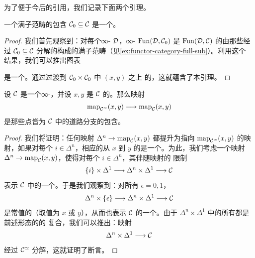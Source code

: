为了便于今后的引用，我们记录下面两个引理。

\begin{lemma}\label{lem:full-subcategory-fully-faithful}
一个满子范畴的包含 $\mathcal{C}_0 \subseteq \mathcal{C}$ 是一个\trFullyFaithful{}\trFunctor{}。
\end{lemma}

\begin{proof}
我们首先观察到：对每个∞-\trCategory{} $\mathcal{D}$，∞-\trCategory{}%
$\mathrm{Fun}(\mathcal{D}, \mathcal{C}_0)$ 是 $\mathrm{Fun}(\mathcal{D}, \mathcal{C})$ 的由那些经过
$\mathcal{C}_0 \subseteq \mathcal{C}$ 分解的\trFunctor{}构成的满子范畴（见\cref{ex:functor-category-full-sub}）。利用这个
结果，我们可以推出图表
\begin{center}
\end{center}
是一个\trPullback{}。通过过渡到 $\mathcal{C}_0 \times \mathcal{C}_0$ 中\trObject{} $(x, y)$ 之上
的\trFibre{}，这就蕴含了本引理。
\end{proof}

\begin{lemma}\label{lem:map-simeq-inclusion}
设 $\mathcal{C}$ 是一个∞-\trCategory{}，并设 $x, y$ 是 $\mathcal{C}$ 的\trObject{}。那么映射
\[
\mathrm{map}_{\mathcal{C}^{\simeq}}(x, y) \longrightarrow \mathrm{map}_{\mathcal{C}}(x, y)
\]
是那些点皆为 $\mathcal{C}$ 中\trEquivalence{}的道路分支的包含。
\end{lemma}

\begin{proof}
我们将证明：任何映射 $\Delta^n \to \mathrm{map}_{\mathcal{C}}(x, y)$ 都提升为指向
$\mathrm{map}_{\mathcal{C}^{\simeq}}(x, y)$ 的映射，如果对每个 $i \in \Delta^n$，相应的从
$x$ 到 $y$ 的\trMorphism{}是一个\trEquivalence{}。为此，我们考虑一个映射
$\Delta^n \to \mathrm{map}_{\mathcal{C}}(x, y)$，使得对每个 $i \in \Delta^n$，其伴随映射的
限制
\[
\{i\} \times \Delta^1 \longrightarrow \Delta^n \times \Delta^1 \longrightarrow \mathcal{C}
\]
表示 $\mathcal{C}$ 中的一个\trEquivalence{}。于是我们观察到：对所有 $\epsilon = 0, 1$，
\[
\Delta^n \times \{\epsilon\} \longrightarrow \Delta^n \times \Delta^1 \longrightarrow \mathcal{C}
\]
是常值的（取值为 $x$ 或 $y$），从而也表示 $\mathcal{C}$ 的一个\trEquivalence{}。由于
$\Delta^n \times \Delta^1$ 中的所有\trMorphism{}都是前述形态的\trMorphism{}的
复合，我们可以推出：映射
\[
\Delta^n \times \Delta^1 \longrightarrow \mathcal{C}
\]
经过 $\mathcal{C}^{\simeq}$ 分解，这就证明了断言。
\end{proof}

